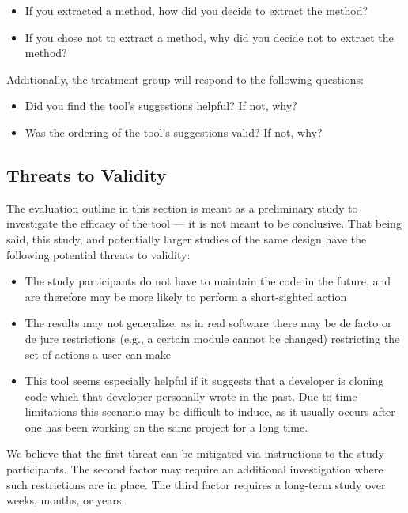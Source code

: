 \documentclass[preprint,10pt]{sigplanconf}
\begin{document}
\begin{itemize}
  \item If you extracted a method, how did you decide to extract the
    method? 
  \item If you chose not to extract a method, why did you decide not
    to extract the method?
\end{itemize}

\noindent Additionally, the treatment group will respond to the following
questions:

\begin{itemize}
  \item Did you find the tool's suggestions helpful? If not, why?
  \item Was the ordering of the tool's suggestions valid? If not, why?
\end{itemize}

\subsection{Threats to Validity}
The evaluation outline in this section is meant as a preliminary study
to investigate the efficacy of the tool --- it is not meant to be
conclusive. That being said, this study, and potentially larger
studies of the same design have the following potential threats to
validity:

\begin{itemize}
  \item The study participants do not have to maintain the code in the
    future, and are therefore may be more likely to perform a
    short-sighted action
  \item The results may not generalize, as in real software there may
    be de facto or de jure restrictions (e.g., a certain module cannot
    be changed) restricting the set of actions a user can make
  \item This tool seems especially helpful if it suggests that a
    developer is cloning code which that developer personally wrote in the
    past.  Due to time limitations this scenario may be difficult to
    induce, as it usually occurs after one has been working on the
    same project for a long time.
\end{itemize}

We believe that the first threat can be mitigated via instructions to
the study participants. The second factor may require an additional
investigation where such restrictions are in place.  The third factor
requires a long-term study over weeks, months, or years.
\end{document}
